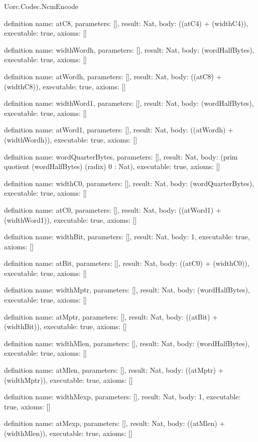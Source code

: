 \begin{lexlean}{Uorc.Codec.NcmEncode}
\begin{semanticmodule}
definition{
  name: atC8,
  parameters: [],
  result: Nat,
  body: ((atC4) + (widthC4)),
  executable: true,
  axioms: []
}

definition{
  name: widthWordh,
  parameters: [],
  result: Nat,
  body: (wordHalfBytes),
  executable: true,
  axioms: []
}

definition{
  name: atWordh,
  parameters: [],
  result: Nat,
  body: ((atC8) + (widthC8)),
  executable: true,
  axioms: []
}

definition{
  name: widthWord1,
  parameters: [],
  result: Nat,
  body: (wordHalfBytes),
  executable: true,
  axioms: []
}

definition{
  name: atWord1,
  parameters: [],
  result: Nat,
  body: ((atWordh) + (widthWordh)),
  executable: true,
  axioms: []
}

definition{
  name: wordQuarterBytes,
  parameters: [],
  result: Nat,
  body: (prim quotient (wordHalfBytes) (radix) 0 : Nat),
  executable: true,
  axioms: []
}

definition{
  name: widthC0,
  parameters: [],
  result: Nat,
  body: (wordQuarterBytes),
  executable: true,
  axioms: []
}

definition{
  name: atC0,
  parameters: [],
  result: Nat,
  body: ((atWord1) + (widthWord1)),
  executable: true,
  axioms: []
}

definition{
  name: widthBit,
  parameters: [],
  result: Nat,
  body: 1,
  executable: true,
  axioms: []
}

definition{
  name: atBit,
  parameters: [],
  result: Nat,
  body: ((atC0) + (widthC0)),
  executable: true,
  axioms: []
}

definition{
  name: widthMptr,
  parameters: [],
  result: Nat,
  body: (wordHalfBytes),
  executable: true,
  axioms: []
}

definition{
  name: atMptr,
  parameters: [],
  result: Nat,
  body: ((atBit) + (widthBit)),
  executable: true,
  axioms: []
}

definition{
  name: widthMlen,
  parameters: [],
  result: Nat,
  body: (wordHalfBytes),
  executable: true,
  axioms: []
}

definition{
  name: atMlen,
  parameters: [],
  result: Nat,
  body: ((atMptr) + (widthMptr)),
  executable: true,
  axioms: []
}

definition{
  name: widthMexp,
  parameters: [],
  result: Nat,
  body: 1,
  executable: true,
  axioms: []
}

definition{
  name: atMexp,
  parameters: [],
  result: Nat,
  body: ((atMlen) + (widthMlen)),
  executable: true,
  axioms: []
}


\end{semanticmodule}
\end{lexlean}
